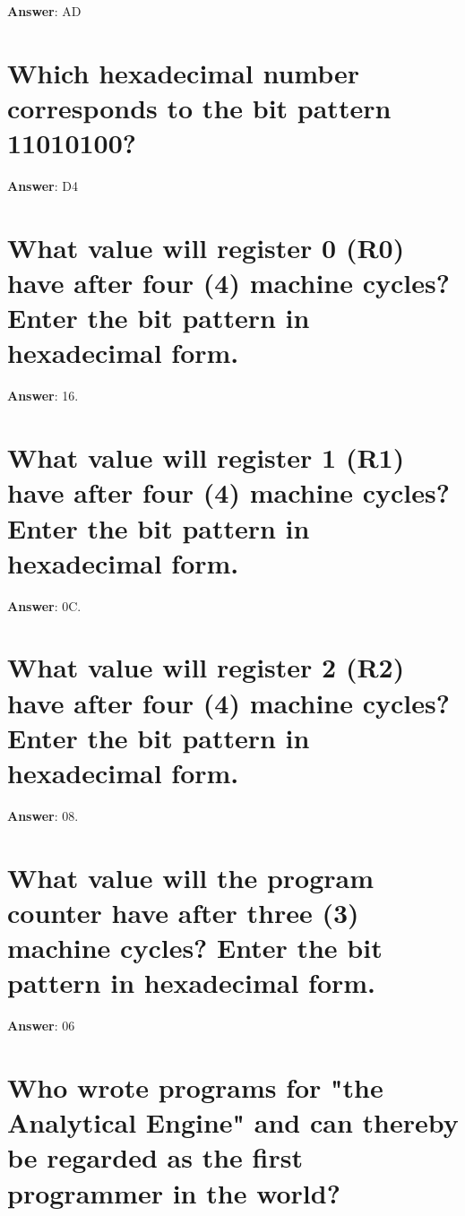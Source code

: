 \documentclass[a4paper,11pt,oneside]{book}
\begin{document}
\begin{sloppypar}
\textbf{Answer}: AD



\section{Which hexadecimal number corresponds to the bit pattern 11010100?}

\label{q:429:sa:en:True}

\textbf{Answer}: D4



\section{What value will register 0 (R0) have after four (4) machine cycles? Enter the bit pattern in hexadecimal form.}

\label{q:430:sa:en:True}

\textbf{Answer}: 16.



\section{What value will register 1 (R1) have after four (4) machine cycles? Enter the bit pattern in hexadecimal form.}

\label{q:431:sa:en:True}

\textbf{Answer}: 0C.



\section{What value will register 2 (R2) have after four (4) machine cycles? Enter the bit pattern in hexadecimal form.}

\label{q:432:sa:en:True}

\textbf{Answer}: 08.



\section{What value will the program counter have after three (3) machine cycles? Enter the bit pattern in hexadecimal form.}

\label{q:433:sa:en:True}

\textbf{Answer}: 06



\section{Who wrote programs for "the Analytical Engine" and can thereby be regarded as the first programmer in the world?}


\end{sloppypar}
\end{document}
